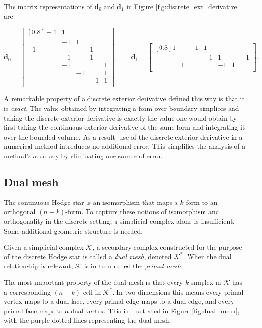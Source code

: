\documentclass[utf8,english]{gradu3}
\begin{document}
The matrix representations of $\mathbf{d}_0$ and $\mathbf{d}_1$
in Figure \ref{fig:discrete_ext_derivative} are

\[
  \mathbf{d}_0 = \begin{bmatrix}[0.8]
    -1 & 1 \\
       & -1 & 1 \\
    -1 & & & 1 \\
       & -1 & & 1 \\
       & -1 & & & 1 \\
       & & -1 & & 1 \\
       & & & -1 & 1 \\
  \end{bmatrix},
  \qquad
  \mathbf{d}_1 = \begin{bmatrix}[0.8]
    1 & & -1 & 1 \\
      & & & -1 & 1 & & -1 \\
      & 1 & & & -1 & 1 \\
  \end{bmatrix}.
\]

A remarkable property of a discrete exterior derivative
defined this way is that it is \textit{exact}.
The value obtained by integrating a form over boundary simplices
and taking the discrete exterior derivative
is exactly the value one would obtain
by first taking the continuous exterior derivative of the same form
and integrating it over the bounded volume.
As a result, use of the discrete exterior derivative in a numerical method
introduces no additional error.
This simplifies the analysis of a method's accuracy
by eliminating one source of error.


\subsection{Dual mesh}\label{sec:dual_mesh}

The continuous Hodge star is an isomorphism
that maps a $k$-form to an orthogonal $(n-k)$-form.
To capture these notions of isomorphism and orthogonality
in the discrete setting, a simplicial complex alone is insufficient.
Some additional geometric structure is needed.

Given a simplicial complex $\mathcal{K}$,
a secondary complex constructed for the purpose of the discrete Hodge star
is called a \textit{dual mesh}, denoted $\mathcal{K}^*$.
When the dual relationship is relevant,
$\mathcal{K}$ is in turn called the \textit{primal mesh}.

The most important property of the dual mesh
is that every $k$-simplex in $\mathcal{K}$
has a corresponding $(n-k)$-cell in $\mathcal{K}^*$.
In two dimensions this means every primal vertex maps to a dual face,
every primal edge maps to a dual edge, and every primal face maps to a dual vertex.
This is illustrated in Figure \ref{fig:dual_mesh},
with the purple dotted lines representing the dual mesh.
\end{document}
